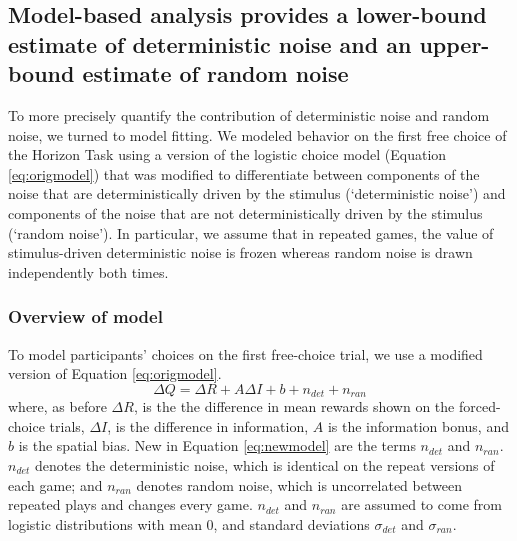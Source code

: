 \documentclass[12pt]{article}
\begin{document}
{\subsection*{Model-based analysis provides a lower-bound estimate of deterministic noise and an upper-bound estimate of random noise}

To more precisely quantify the contribution of deterministic noise and random noise, we turned to model fitting. We modeled behavior on the first free choice of the Horizon Task using a version of the logistic choice model (Equation \ref{eq:origmodel}) that was modified to differentiate between components of the noise that are deterministically driven by the stimulus (`deterministic noise') and components of the noise that are not deterministically driven by the stimulus (`random noise'). In particular, we assume that in repeated games, the value of stimulus-driven deterministic noise is frozen whereas random noise is drawn independently both times. 

\subsubsection*{Overview of model}
To model participants' choices on the first free-choice trial, we use a modified version of Equation \ref{eq:origmodel}.
\begin{equation}
	\label{eq:newmodel}
	\Delta Q= \Delta R+A \Delta I+b+n_{det}+n_{ran}
\end{equation}
where, as before $\Delta R$, is the the difference in mean rewards shown on the forced-choice trials, $\Delta I$, is the difference in information, $A$ is the information bonus, and $b$ is the spatial bias. New in Equation \ref{eq:newmodel} are the terms $n_{det}$ and $n_{ran}$. $n_{det}$ denotes the deterministic noise, which is identical on the repeat versions of each game; and $n_{ran}$ denotes random noise, which is uncorrelated between repeated plays and changes every game. $n_{det}$ and $n_{ran}$ are assumed to come from logistic distributions with mean 0, and standard deviations $\sigma_{det}$ and $\sigma_{ran}$. 

}
\end{document}
